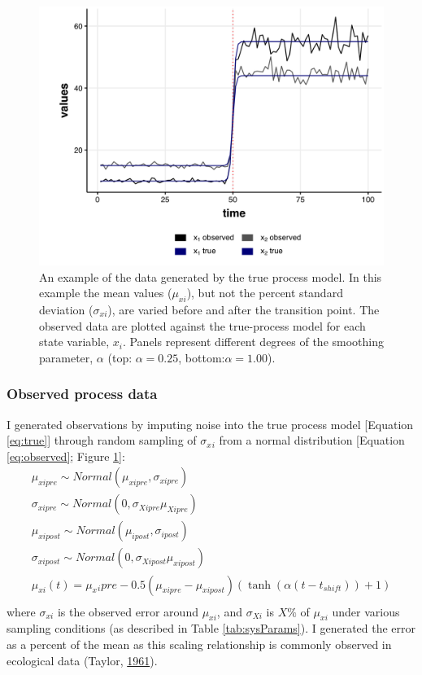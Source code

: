 \documentclass[print]{nuthesis}
\begin{document}
\begin{figure}
\includegraphics[width=0.85\linewidth]{./chapterFiles/velocity/figsCalledInDiss/changeMuBoth_tanhAlpha1-100tvdiffAlpha-1000iter_origDat} \caption{An example of the data generated by the true process model. In this example the mean values ($\mu_{xi}$), but not the percent standard deviation ($\sigma_{xi}$), are varied before and after the transition point. The observed data are plotted against the true-process model for each state variable, $x_i$. Panels represent different degrees of the smoothing parameter, $\alpha$ (top: $\alpha=0.25$, bottom:$\alpha=1.00$).}\label{fig:trueObsEx}
\end{figure}
\hypertarget{observed-process-data}{%
\subsubsection{Observed process data}\label{observed-process-data}}

I generated observations by imputing noise into the true process model {[}Equation \eqref{eq:true}{]} through random sampling of \(\sigma_x{_i}\) from a normal distribution {[}Equation \eqref{eq:observed}; Figure \ref{fig:trueObsEx}{]}:
\begin{equation}
\begin{array}{rcl}
\mu_{xipre}\sim Normal(\mu_{xipre},\sigma_{xipre}) \\ 
\sigma_{xipre} \sim Normal(0,\sigma_{Xipre}\mu_{Xipre}) \\
\mu_{xipost} \sim Normal(\mu_{ipost},\sigma_{ipost}) \\ 
\sigma_{xipost} \sim Normal(0,\sigma_{Xipost}\mu_{xipost}) \\
\mu_{xi}(t) = \mu_x{_ipre}  - 0.5(\mu_{xipre}-\mu_{xipost})(\tanh(\alpha (t-t_{shift}))+1) \\
\end{array}
\label{eq:observed}
\end{equation}
where \(\sigma_{xi}\) is the observed error around \(\mu_{xi}\), and \(\sigma_{Xi}\) is \(X\%\) of \(\mu_{xi}\) under various sampling conditions (as described in Table \ref{tab:sysParams}). I generated the error as a percent of the mean as this scaling relationship is commonly observed in ecological data (Taylor, \protect\hyperlink{ref-taylor1961aggregation}{1961}).
\end{document}
